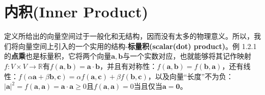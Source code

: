 \documentclass[mathserif,hyperref,UTF8,openany,b5paper]{ctexbook}
\begin{document}
\section{内积(Inner Product)}
定义所给出的向量空间过于一般化和无结构，因而没有太多的物理意义。所以，我们将向量空间上引入的一个实用的结构-\textbf{标量积(scalar(dot) product)}。例 1.2.1的\textbf{点乘}也是标量积，它将两个向量$\mathbf{a,b}$与一个实数对应，也就能够将其记作映射$f:V\times V \xrightarrow{}\mathbb{R}$有$f(\mathbf{a},\mathbf{b})=\mathbf{a}\cdot\mathbf{b}$，并且有对称性：$f(\mathbf{a},\mathbf{b})=f(\mathbf{b},\mathbf{a})$，还有线性：$f(\alpha\mathbf{a}+\beta\mathbf{b},\mathbf{c})=\alpha f(\mathbf{a},\mathbf{c})+\beta f(\mathbf{b},\mathbf{c})$，以及向量“长度”不为负：$|\mathbf{a}|^2=f(\mathbf{a},\mathbf{a})=\mathbf{a}\cdot\mathbf{a} \geq 0$且$f(\mathbf{a},\mathbf{a})=0$当且仅当$\mathbf{a}=\mathbf{0}$。
\end{document}

